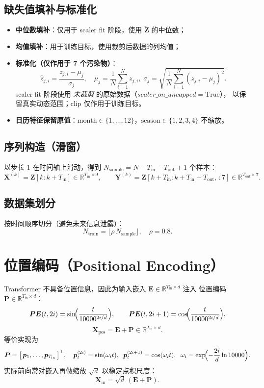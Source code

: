 \documentclass[11pt,a4paper]{article}
\newcommand{\R}{\mathbb{R}}
\newcommand{\mat}[1]{\bm{#1}}
\newcommand{\vect}[1]{\bm{#1}}
\begin{document}
\subsection{缺失值填补与标准化}
\begin{itemize}[leftmargin=*]
  \item \textbf{中位数填补}：仅用于 scaler fit 阶段，使用 $\widetilde{\mat{Z}}$ 的中位数；
  \item \textbf{均值填补}：用于训练目标，使用裁剪后数据的列均值；
  \item \textbf{标准化（仅作用于 7 个污染物）}：
  \[
  \hat{z}_{j,i} = \frac{z_{j,i} - \mu_j}{\sigma_j},\quad
  \mu_j = \frac{1}{N}\sum_{i=1}^N z_{j,i},\;
  \sigma_j = \sqrt{\frac{1}{N}\sum_{i=1}^N (z_{j,i} - \mu_j)^2}.
  \]
  scaler fit 阶段使用 \emph{未裁剪} 的原始数据（$scaler\_on\_uncapped = \text{True}$），
  以保留真实动态范围；clip 仅作用于训练目标。
  \item \textbf{日历特征保留原值}：$\text{month} \in \{1,\dots,12\}$，$\text{season} \in \{1,2,3,4\}$ 不缩放。
\end{itemize}

\subsection{序列构造（滑窗）}
以步长 $1$ 在时间轴上滑动，得到 $N_{\text{sample}} = N - T_{\text{in}} - T_{\text{out}} + 1$ 个样本：
\[
\mat{X}^{(k)} = \mat{Z}[k : k + T_{\text{in}}] \in \R^{T_{\text{in}} \times 9},\qquad
\mat{Y}^{(k)} = \mat{Z}[k + T_{\text{in}} : k + T_{\text{in}} + T_{\text{out}},\, :7] \in \R^{T_{\text{out}} \times 7}.
\]

\subsection{数据集划分}
按时间顺序切分（避免未来信息泄露）：
\[
N_{\text{train}} = \lfloor \rho\, N_{\text{sample}}\rfloor,\quad \rho = 0.8.
\]

\section{位置编码（Positional Encoding）}
Transformer 不具备位置信息，因此为输入嵌入 $\mat{E} \in \R^{T_{\text{in}} \times d}$ 注入
位置编码 $\mat{P} \in \R^{T_{\text{in}} \times d}$：
\[
\mat{PE}(t, 2i)   = \sin\!\Bigl(\frac{t}{10000^{2i/d}}\Bigr),\qquad
\mat{PE}(t, 2i+1) = \cos\!\Bigl(\frac{t}{10000^{2i/d}}\Bigr),
\]
\[
\mat{X}_{\text{pos}} = \mat{E} + \mat{P}\in \R^{T_{\text{in}} \times d}.
\]
等价实现为
\[
\mat{P} = \bigl[\,\vect{p}_1, \dots, \vect{p}_{T_{\text{in}}}\,\bigr]^{\top},\quad
\vect{p}_t^{(2i)} = \sin(\omega_i t),\;\;
\vect{p}_t^{(2i+1)} = \cos(\omega_i t),\;\;
\omega_i = \exp\!\Bigl(-\frac{2i}{d}\ln 10000\Bigr).
\]
实际前向常对嵌入再做缩放 $\sqrt{d}$ 以稳定点积尺度：
\[
\mat{X}_{\text{in}} = \sqrt{d}\,(\mat{E} + \mat{P}).
\]
\end{document}
